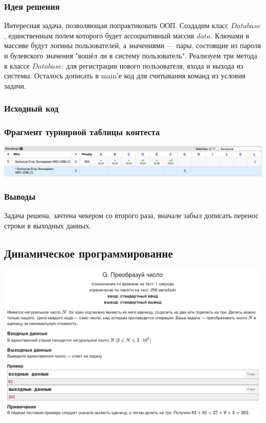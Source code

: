 \subsubsection*{Идея решения}

Интересная задача, позволяющая попрактиковать ООП. Создадим класс $Database$, единственным полем которого будет ассоциативный массив $data$. Ключами в массиве будут логины пользователей, а значениями --- пары, состоящие из пароля и булевского значения "вошёл ли в систему пользователь". Реализуем три метода в классе $Database$: для регистрации нового пользователя, входа и выхода из системы. Осталось дописать в main'е код для считывания команд из условия задачи.

\subsubsection*{Исходный код}


\subsubsection*{Фрагмент турнирной таблицы контеста}
\begin{center}
\includegraphics[width=\textwidth]{standings/20220701/table.png}\newline\noindent
\end{center}

\subsubsection*{Выводы}

Задача решена, зачтена чекером со второго раза, вначале забыл дописать перенос строки в выходных данных.

\pagebreak

\subsection*{Динамическое программирование}
\begin{center}
\includegraphics[width=\textwidth]{statements/20220702/G.png}
\end{center}
